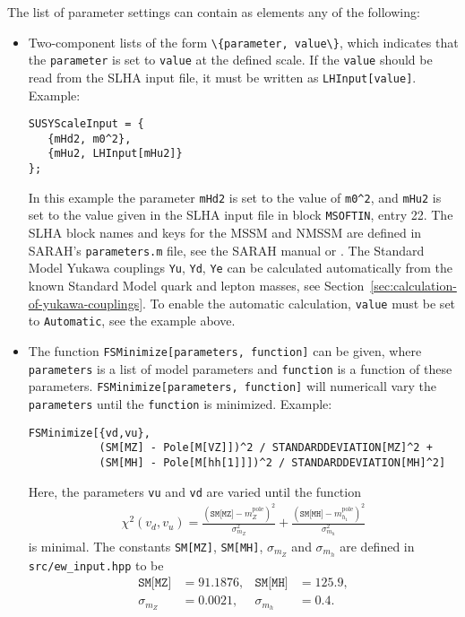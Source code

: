 \documentclass[final,3p,11pt,pdflatex]{elsarticle}
\newcommand{\code}[1]{\lstinline|#1|}  %
\newcommand{\pole}{\text{pole}}
\begin{document}
The list of parameter settings can contain as elements any of the
following:
%
\begin{itemize}
\item Two-component lists of the form \code{\{parameter, value\}},
  which indicates that the \code{parameter} is set to \code{value} at
  the defined scale.  If the \code{value} should be read from the SLHA
  input file, it must be written as \code{LHInput[value]}.  Example:
  \begin{lstlisting}
SUSYScaleInput = {
   {mHd2, m0^2},
   {mHu2, LHInput[mHu2]}
};
  \end{lstlisting}
  In this example the parameter \code{mHd2} is set to the value of
  \code{m0^2}, and \code{mHu2} is set to the value given in the SLHA
  input file in block \code{MSOFTIN}, entry 22.  The SLHA block names
  and keys for the MSSM and NMSSM are defined in SARAH's
  \code{parameters.m} file, see the SARAH manual or
  \cite{Staub:2010jh}.  The Standard Model Yukawa couplings \code{Yu},
  \code{Yd}, \code{Ye} can be calculated automatically from the known
  Standard Model quark and lepton masses, see
  Section~\ref{sec:calculation-of-yukawa-couplings}.  To enable the
  automatic calculation, \code{value} must be set to \code{Automatic},
  see the example above.

\item The function \code{FSMinimize[parameters, function]} can be
  given, where \code{parameters} is a list of model parameters and
  \code{function} is a function of these parameters.
  \code{FSMinimize[parameters, function]} will numericall vary the
  \code{parameters} until the \code{function} is minimized.  Example:
  \begin{lstlisting}
FSMinimize[{vd,vu},
           (SM[MZ] - Pole[M[VZ]])^2 / STANDARDDEVIATION[MZ]^2 +
           (SM[MH] - Pole[M[hh[1]]])^2 / STANDARDDEVIATION[MH]^2]
  \end{lstlisting}
  Here, the parameters \code{vu} and \code{vd} are varied until the
  function
  \begin{align}
    \chi^2(v_d,v_u) =
    \frac{(\texttt{SM[MZ]}-m_Z^\pole)^2}{\sigma_{m_Z}^2} +
    \frac{(\texttt{SM[MH]}-m_{h_1}^\pole)^2}{\sigma_{m_h}^2}
  \end{align}
  is minimal.  The constants \code{SM[MZ]}, \code{SM[MH]},
  $\sigma_{m_Z}$ and $\sigma_{m_h}$ are defined in
  \code{src/ew_input.hpp} to be
  \begin{align}
    \texttt{SM[MZ]} &= 91.1876, &
    \texttt{SM[MH]} &= 125.9, \\
    \sigma_{m_Z} &= 0.0021, &
    \sigma_{m_h} &= 0.4 .
  \end{align}


\end{itemize}
\end{document}
